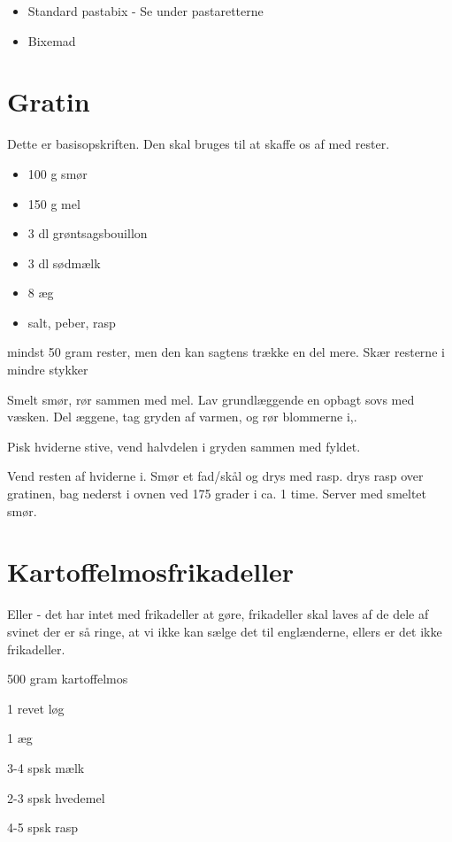\documentclass[
]{book}
\providecommand{\tightlist}{%
  \setlength{\itemsep}{0pt}\setlength{\parskip}{0pt}}
\begin{document}
\begin{itemize}
\tightlist
\item
  Standard pastabix - Se under pastaretterne
\item
  Bixemad
\end{itemize}

\section{Gratin}\label{gratin}

Dette er basisopskriften. Den skal bruges til at skaffe os af med rester.

\begin{itemize}
\tightlist
\item
  100 g smør
\item
  150 g mel
\item
  3 dl grøntsagsbouillon
\item
  3 dl sødmælk
\item
  8 æg
\item
  salt, peber, rasp
\end{itemize}

mindst 50 gram rester, men den kan sagtens trække en del mere.
Skær resterne i mindre stykker

Smelt smør, rør sammen med mel. Lav grundlæggende en opbagt
sovs med væsken.
Del æggene, tag gryden af varmen, og rør blommerne i,.

Pisk hviderne stive, vend halvdelen i gryden sammen med fyldet.

Vend resten af hviderne i. Smør et fad/skål
og drys med rasp. drys rasp over gratinen, bag nederst i ovnen
ved 175 grader i ca. 1 time. Server med smeltet smør.

\section{Kartoffelmosfrikadeller}\label{kartoffelmosfrikadeller}

Eller - det har intet med frikadeller at gøre, frikadeller skal laves af de dele af svinet der er så ringe, at vi ikke kan sælge det til englænderne, ellers er det ikke frikadeller.

500 gram kartoffelmos

1 revet løg

1 æg

3-4 spsk mælk

2-3 spsk hvedemel

4-5 spsk rasp
\end{document}
